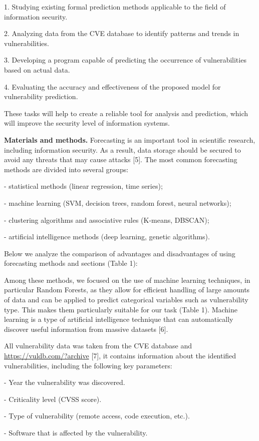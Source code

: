 \begin{multicols}{2}
1. Studying existing formal prediction methods applicable to the field
of information security.

2. Analyzing data from the CVE database to identify patterns and trends
in vulnerabilities.

3. Developing a program capable of predicting the occurrence of
vulnerabilities based on actual data.

4. Evaluating the accuracy and effectiveness of the proposed model for
vulnerability prediction.

These tasks will help to create a reliable tool for analysis and
prediction, which will improve the security level of information
systems.

{\bfseries Materials and methods.} Forecasting is an important tool in
scientific research, including information security. As a result, data
storage should be secured to avoid any threats that may cause attacks
{[}5{]}. The most common forecasting methods are divided into several
groups:

- statistical methods (linear regression, time series);

- machine learning (SVM, decision trees, random forest, neural
networks);

- clustering algorithms and associative rules (K-means, DBSCAN);

- artificial intelligence methods (deep learning, genetic algorithms).

Below we analyze the comparison of advantages and disadvantages of using
forecasting methods and sections (Table 1):

Among these methods, we focused on the use of machine learning
techniques, in particular Random Forests, as they allow for efficient
handling of large amounts of data and can be applied to predict
categorical variables such as vulnerability type. This makes them
particularly suitable for our task (Table 1). Machine learning is a type
of artificial intelligence technique that can automatically discover
useful information from massive datasets {[}6{]}.

All vulnerability data was taken from the CVE database and
\url{https://vuldb.com/?archive} {[}7{]}, it contains information about
the identified vulnerabilities, including the following key parameters:

- Year the vulnerability was discovered.

- Criticality level (CVSS score).

- Type of vulnerability (remote access, code execution, etc.).

- Software that is affected by the vulnerability.
\end{multicols}


